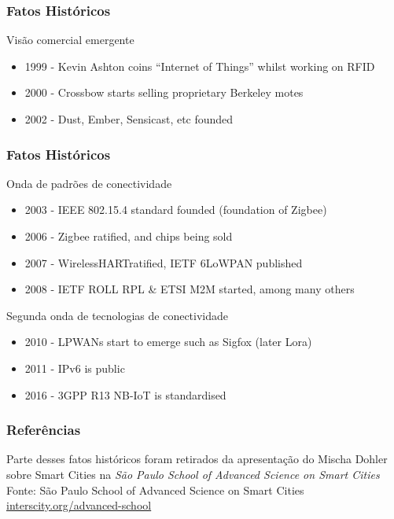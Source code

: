 \documentclass{beamer}
\begin{document}
\begin{frame}
\frametitle{Fatos Históricos}
Visão comercial emergente

\begin{itemize}
	\item 1999 - Kevin Ashton coins “Internet of Things” whilst working on RFID
	\item 2000 - Crossbow starts selling proprietary Berkeley motes
	\item 2002 - Dust, Ember, Sensicast, etc founded
\end{itemize}

\end{frame}

\begin{frame}
\frametitle{Fatos Históricos}

Onda de padrões de conectividade

\begin{itemize}
	\item 2003 - IEEE 802.15.4 standard founded (foundation of Zigbee)
	\item 2006 - Zigbee ratified, and chips being sold
	\item 2007 - WirelessHARTratified, IETF 6LoWPAN published
	\item 2008 - IETF ROLL RPL \& ETSI M2M started, among many others
\end{itemize}

Segunda onda de tecnologias de conectividade

\begin{itemize}
	\item 2010 - LPWANs start to emerge such as Sigfox (later Lora)
	\item 2011 - IPv6 is public
	\item 2016 - 3GPP R13 NB-IoT is standardised
\end{itemize}

\end{frame}

\begin{frame}
	\frametitle{Referências}
	Parte desses fatos históricos foram retirados da apresentação do Mischa Dohler sobre Smart Cities na \textit{São Paulo School of Advanced Science on Smart Cities}\\
	\bigskip
	\scriptsize Fonte: São Paulo School of Advanced Science on Smart Cities\\
	\tiny \url{interscity.org/advanced-school}
\end{frame}
\end{document}
